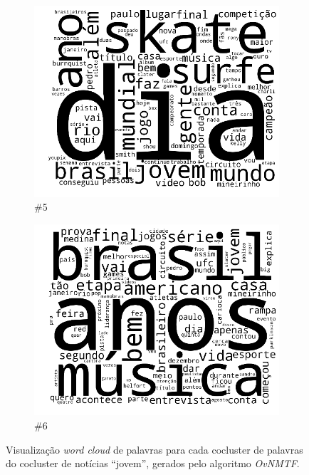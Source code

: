 \documentclass[
    12pt,                %
    oneside,            %
    a4paper,            %
    english,            %
    brazil                %
    ]{abntex2ppgsi}
\begin{document}
\begin{figure}[H]
\begin{subfigure}[b]{0.15\textwidth}
        \includegraphics[width=\textwidth]{img/ovnmtf-nc-2-tc-5.png}
        \caption{\#5}
    \end{subfigure}
    \begin{subfigure}[b]{0.15\textwidth}
        \includegraphics[width=\textwidth]{img/ovnmtf-nc-2-tc-6.png}
        \caption{\#6}
    \end{subfigure}

    \caption{Visualização \textit{word cloud} de palavras para cada cocluster de palavras do cocluster de notícias ``jovem'', gerados pelo algoritmo \textit{OvNMTF}.}
    \label{fig:ovnmtf:wordcloud-3}
\end{figure}
\end{document}
